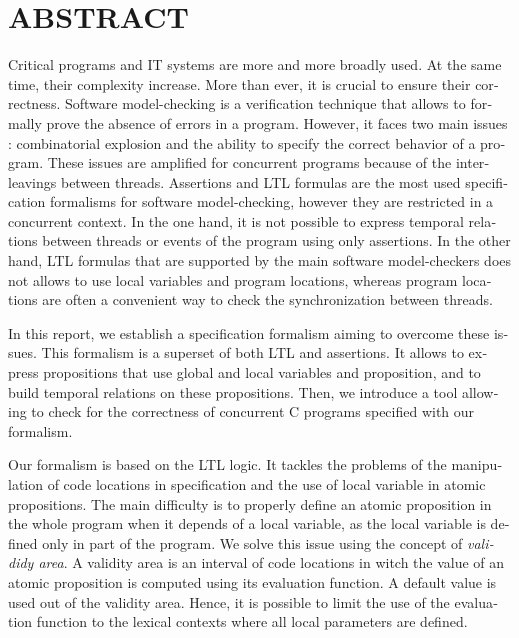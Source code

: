 %

\chapter*{ABSTRACT}\thispagestyle{headings}
%
\begin{otherlanguage}{english}

Critical programs and IT systems are more and more broadly used. At the same
time, their complexity increase. More than ever, it is crucial to ensure their
correctness. Software model-checking is a verification technique that allows to
formally prove the absence of errors in a program. However, it faces two main
issues : combinatorial explosion and the ability to specify the correct behavior
of a program. These issues are amplified for concurrent programs because of the
interleavings between threads. Assertions and LTL formulas are the most used
specification formalisms for software model-checking, however they are
restricted in a concurrent context. In the one hand, it is not possible to
express temporal relations between threads or events of the program using only
assertions. In the other hand, LTL formulas that are supported by the main
software model-checkers does not allows to use local variables and program
locations, whereas program locations are often a convenient way to check the
synchronization between threads.

In this report, we establish a specification formalism aiming to overcome these
issues. This formalism is a superset of both LTL and assertions. It allows to
express propositions that use global and local variables and proposition, and to
build temporal relations on these propositions. Then, we introduce a tool
allowing to check for the correctness of concurrent C programs specified with
our formalism.

Our formalism is based on the LTL logic. It tackles the problems of the
manipulation of code locations in specification and the use of local variable
in atomic propositions. The main difficulty is to properly define an atomic
proposition in the whole program when it depends of a local variable, as the
local variable is defined only in part of the program. We solve this issue using
the concept of \emph{valididy area}. A validity area is an interval of code
locations in witch the value of an atomic proposition is computed using its
evaluation function. A default value is used out of the validity area. Hence, it
is possible to limit the use of the evaluation function to the lexical contexts
where all local parameters are defined.


\end{otherlanguage}
